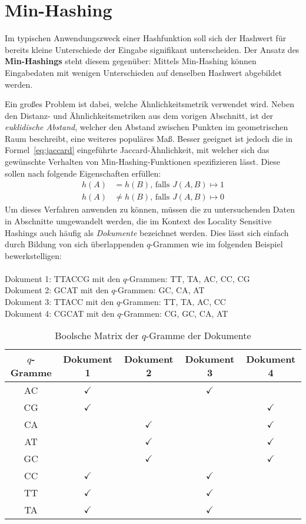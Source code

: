 \section{Min-Hashing}
\label{sec:hash:min}
Im typischen Anwendungszweck einer Hashfunktion soll sich der Hashwert für bereits kleine Unterschiede der Eingabe signifikant unterscheiden.
Der Ansatz des \textbf{Min-Hashings} steht diesem gegenüber:
Mittels Min-Hashing können Eingabedaten mit wenigen Unterschieden auf denselben Hashwert abgebildet werden.

Ein großes Problem ist dabei, welche Ähnlichkeitsmetrik verwendet wird.
Neben den Distanz- und Ähnlichkeitsmetriken aus dem vorigen Abschnitt, ist der \textit{euklidische Abstand}, welcher den Abstand zwischen Punkten im geometrischen Raum beschreibt, eine weiteres populäres Maß.
Besser geeignet ist jedoch die in Formel~\eqref{eq:jaccard} eingeführte Jaccard-Ähnlichkeit, mit welcher sich das gewünschte Verhalten von Min-Hashing-Funktionen spezifizieren lässt.
Diese sollen nach \citet{Indyk1998} folgende Eigenschaften erfüllen:
\begin{align*}
		h(A) &= h(B) \text{, falls } J(A,B) \mapsto 1 \\
		h(A) &\neq h(B) \text{, falls } J(A,B) \mapsto 0
\end{align*} 
Um dieses Verfahren anwenden zu können, müssen die zu untersuchenden Daten in Abschnitte  umgewandelt werden, die im Kontext des Locality Sensitive Hashings auch häufig als \textit{Dokumente} bezeichnet werden.
Dies lässt sich einfach durch Bildung von sich überlappenden $q$-Grammen wie im folgenden Beispiel bewerkstelligen: \\\\
Dokument 1: TTACCG mit den $q$-Grammen: TT, TA, AC, CC, CG \\ 
Dokument 2: GCAT mit den $q$-Grammen: GC, CA, AT \\
Dokument 3: TTACC mit den $q$-Grammen: TT, TA, AC, CC \\
Dokument 4: CGCAT mit den $q$-Grammen: CG, GC, CA, AT
\begin{table}[H]
\begin{center}
	\begin{tabular}{|c|c|c|c|c|}
	\hline 
	$q$-Gramme & Dokument 1 & Dokument 2 & Dokument 3 & Dokument 4\\ 
	\hline 
	AC & $\checkmark$ & & $\checkmark$ &\\ 
	CG &  $\checkmark$& & &  $\checkmark$\\ 
	CA & & $\checkmark$ & & $\checkmark$\\ 
	AT & & $\checkmark$ & & $\checkmark$\\ 
	GC & &  $\checkmark$ & & $\checkmark$\\ 
	CC & $\checkmark$ &  & $\checkmark$ & \\ 
	TT & $\checkmark$  & &  $\checkmark$ &\\
	TA & $\checkmark$  & &   $\checkmark$&\\ 
	\hline 
	\end{tabular} 
\end{center}
\caption{Boolsche Matrix der $q$-Gramme der Dokumente}
\label{table:bool-qgramm}
\end{table}
